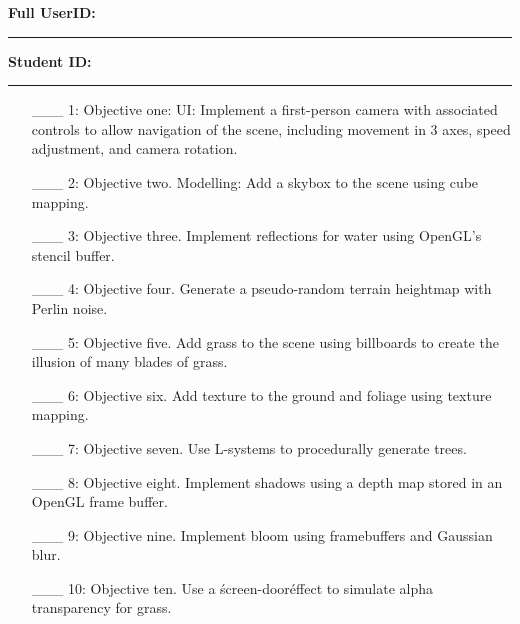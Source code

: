 \documentclass {article}
\begin{document}

{\hfill{\bf Full UserID:\rule{2in}{.1mm}}\hfill{\bf Student ID:\rule{2in}{.1mm}}\hfill}

\begin{enumerate}
     \item[\_\_\_ 1:]  Objective one: UI: Implement a first-person camera with associated controls to allow navigation of the scene, including movement in 3 axes, speed adjustment, and camera rotation.

     \item[\_\_\_ 2:]  Objective two. Modelling: Add a skybox to the scene using cube mapping.

     \item[\_\_\_ 3:]  Objective three. Implement reflections for water using OpenGL's stencil buffer.

     \item[\_\_\_ 4:]  Objective four. Generate a pseudo-random terrain heightmap with Perlin noise.

     \item[\_\_\_ 5:]  Objective five. Add grass to the scene using billboards to create the illusion of many blades of grass.

     \item[\_\_\_ 6:]  Objective six. Add texture to the ground and foliage using texture mapping.

     \item[\_\_\_ 7:]  Objective seven. Use L-systems to procedurally generate trees.

     \item[\_\_\_ 8:]  Objective eight. Implement shadows using a depth map stored in an OpenGL frame buffer.

     \item[\_\_\_ 9:]  Objective nine. Implement bloom using framebuffers and Gaussian blur.

     \item[\_\_\_ 10:]  Objective ten. Use a \'screen-door\' effect to simulate alpha transparency for grass.
\end{enumerate}
\end{document}
